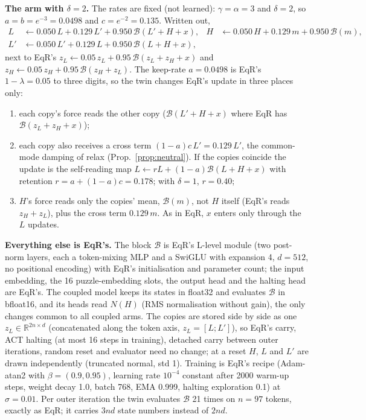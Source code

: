 \documentclass[11pt]{article}
\theoremstyle{definition}
\newcommand{\R}{\mathbb{R}}
\newcommand{\zH}{z_H}
\newcommand{\zL}{z_L}
\newcommand{\Bk}{\mathcal{B}}
\begin{document}
\noindent\textbf{The arm with $\delta=2$.} The rates are fixed (not learned): $\gamma=\alpha=3$ and $\delta=2$, so $a=b=e^{-3}=0.0498$ and
$c=e^{-2}=0.135$. Written out,
\begin{align*}
L &\leftarrow 0.050\,L + 0.129\,L' + 0.950\,\Bk(L'+H+x), & H &\leftarrow 0.050\,H + 0.129\,m + 0.950\,\Bk(m),\\
L' &\leftarrow 0.050\,L' + 0.129\,L + 0.950\,\Bk(L+H+x), &&
\end{align*}
next to EqR's $\zL\leftarrow0.05\,\zL+0.95\,\Bk(\zL+\zH+x)$ and $\zH\leftarrow0.05\,\zH+0.95\,\Bk(\zH+\zL)$. The keep-rate $a=0.0498$ is
EqR's $1-\lambda=0.05$ to three digits, so the twin changes EqR's update in three places only:
\begin{enumerate}[label=(\roman*),leftmargin=*,itemsep=1pt]
\item each copy's force reads the other copy ($\Bk(L'+H+x)$ where EqR has $\Bk(\zL+\zH+x)$);
\item each copy also receives a cross term $(1-a)c\,L'=0.129\,L'$, the common-mode damping of relax (Prop.~\ref{prop:neutral}). If the copies
coincide the update is the self-reading map $L\leftarrow rL+(1-a)\Bk(L+H+x)$ with retention $r=a+(1-a)c=0.178$; with $\delta=1$, $r=0.40$;
\item $H$'s force reads only the copies' mean, $\Bk(m)$, not $H$ itself (EqR's reads $\zH+\zL$), plus the cross term $0.129\,m$. As in EqR, $x$
enters only through the $L$ updates.
\end{enumerate}
\noindent\textbf{Everything else is EqR's.} The block $\Bk$ is EqR's L-level module (two post-norm layers, each a token-mixing MLP and
a SwiGLU with expansion 4, $d=512$, no positional encoding) with EqR's initialisation and parameter count; the input embedding, the 16
puzzle-embedding slots, the output head and the halting head are EqR's. The coupled model keeps its states in float32 and evaluates $\Bk$ in bfloat16,
and its heads read $N(H)$ (RMS normalisation without gain), the only changes common to all coupled arms. The copies are stored side by
side as one $\zL\in\R^{2n\times d}$ (concatenated along the token axis, $\zL=[L;L']$), so EqR's carry, ACT halting
(at most 16 steps in training), detached carry between outer iterations, random reset and evaluator need no change; at a reset $H$, $L$
and $L'$ are drawn independently (truncated normal, std 1). Training is EqR's recipe (Adam-atan2 with $\beta=(0.9,0.95)$, learning rate $10^{-4}$
constant after 2000 warm-up steps, weight decay 1.0, batch 768, EMA 0.999, halting exploration 0.1) at $\sigma=0.01$. Per outer iteration the twin
evaluates $\Bk$ 21 times on $n=97$ tokens, exactly as EqR; it carries $3nd$ state numbers instead of $2nd$.
\end{document}
